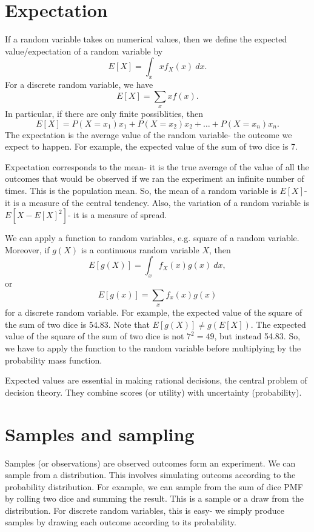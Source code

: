 \documentclass[a4paper, openany]{memoir}
\begin{document}
\section{Expectation}
If a random variable takes on numerical values, then we define the  expected value/expectation of a random variable by
\[E[X] = \int_x xf_X(x) \ dx.\]
For a discrete random variable, we have
\[E[X] = \sum_x xf(x).\]
In particular, if there are only finite possiblities, then
\[E[X] = P(X = x_1) x_1 + P(X = x_2) x_2 + \dots + P(X = x_n) x_n.\]
The expectation is the average value of the random variable- the outcome we expect to happen. For example, the expected value of the sum of two dice is 7.

Expectation corresponds to the mean- it is the true average of the value of all the outcomes that would be observed if we ran the experiment an infinite number of times. This is the population mean. So, the mean of a random variable is $E[X]$- it is a measure of the central tendency. Also, the variation of a random variable is $E[X - E[X]^2]$- it is a measure of spread.

We can apply a function to random variables, e.g. square of a random variable. Moreover, if $g(X)$ is a continuous random variable $X$, then
\[E[g(X)] = \int_x f_X(x) g(x) \ dx,\]
or
\[E[g(x)] = \sum_x f_x(x) g(x)\]
for a discrete random variable. For example, the expected value of the square of the sum of two dice is 54.83. Note that $E[g(X)] \neq g(E[X])$. The expected value of the square of the sum of two dice is not $7^2 = 49$, but instead 54.83. So, we have to apply the function to the random variable before multiplying by the probability mass function.


Expected values are essential in making rational decisions, the central problem of decision theory. They combine scores (or utility) with uncertainty (probability).

\section{Samples and sampling}
Samples (or observations) are observed outcomes form an experiment. We can sample from a distribution. This involves simulating outcoms according to the probability distribution. For example, we can sample from the sum of dice PMF by rolling two dice and summing the result. This is a sample or a draw from the distribution. For discrete random variables, this is easy- we simply produce samples by drawing each outcome according to its probability.
\end{document}
